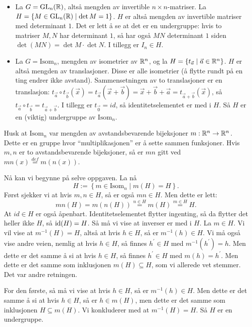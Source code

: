 \documentclass[11pt, norsk]{article}
\begin{document}
\begin{losn}
\begin{itemize}
\item La $G=\operatorname{GL}_n(\mathbb{R})$, altså mengden av invertible $n \times n$-matriser. La $H = \{M \in \operatorname{GL}_n(\mathbb{R}) \mid \det M = 1 \}$. $H$ er altså mengden av invertible matriser med determinant $1$. Det er lett å se at det er en undergruppe: hvis to matriser $M,N$ har determinant $1$, så har også $MN$ determinant $1$ siden $\det(MN)=\det M  \cdot \det N$. I tillegg er $I_n \in H$. 
\item La $G=\mathrm{Isom}_n$, mengden av isometrier av $\mathbb{R}^n$, og la $H= \{ t_{\vec a} \mid \vec a \in \mathbb{R}^n \}$. $H$ er altså mengden av translasjoner. Disse er alle isometrier (å flytte rundt på en ting endrer ikke avstand). Sammensetningen av to translasjoner er en translasjon: $t_{\vec a} \circ t_{\vec b}(\vec x)= t_{\vec a}(\vec x + \vec b)=\vec x + \vec b + \vec a =t_{\vec a + \vec b}(\vec x)$, så $t_{\vec a}\circ t_{\vec b}=t_{\vec a + \vec b}$. I tillegg er $t_{\vec 0} = id$, så identitetselementet er med i $H$. Så $H$ er en (viktig) undergruppe av $\mathrm{Isom}_n$.
\end{itemize}
Husk at $\mathrm{Isom}_n$ var mengden av avstandsbevarende bijeksjoner $m:\mathbb{R}^n \to \mathbb{R}^n$. Dette er en gruppe hvor ``multiplikasjonen'' er å sette sammen funksjoner. Hvis $m,n$ er to avstandsbevarende bijeksjoner, så er $mn$ gitt ved $mn(x) \stackrel{def}{=} m(n(x))$.

Nå kan vi begynne på selve oppgaven. La nå
\[
H := \left\{ m \in \mathrm{Isom}_n \mid m(H)=H \right\}.
\]
Først sjekker vi at hvis $m,n \in H$, så er også $mn \in H$. Men dette er lett:
\[
mn(H) = m(n(H)) \stackrel{n \in H}= m(H) \stackrel{m \in H}= H.
\]
At $id \in H$ er også åpenbart. Identitetselementet flytter ingenting, så da flytter det heller ikke $H$, så $\text{id}(H)=H$. Så må vi vise at inverser er med i $H$. La $m \in H$. Vi vil vise at $m^{-1}(H)=H$, altså at hvis $h \in H$, så er $m^{-1}(h) \in H$. Vi må også vise andre veien, nemlig at hvis $h \in H$, så finnes $h^{\prime} \in H$ med $m^{-1}(h^\prime)=h$. Men dette er det samme å si at hvis $h \in H$, så finnes $h^\prime \in H$ med $m(h)=h^\prime$. Men dette er det samme som inklusjonen $m(H) \subseteq H$, som vi allerede vet stemmer. Det var andre retningen.

For den første, så må vi vise at hvis $h \in H$, så er $m^{-1}(h) \in H$. Men dette er det samme å si at hvis $h \in H$, så er $h \in m(H)$, men dette er det samme som inklusjonen $H \subseteq m(H)$. Vi konkluderer med at $m^{-1}(H)=H$. Så $H$ er en undergruppe.
\end{losn}
\end{document}
